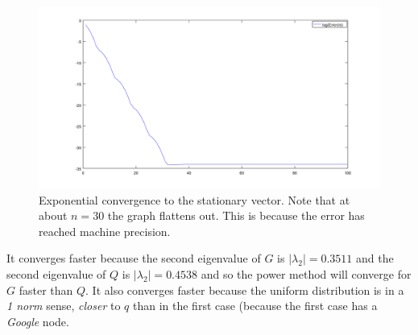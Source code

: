 \documentclass{unswmaths}
\begin{document}
\begin{figure}[h]
    \includegraphics[scale=0.5]{Log_Error_n_2}
    \caption{Exponential convergence to the stationary vector. Note that at about $n = 30 $ the graph flattens out. This is because the error has reached machine precision.}
\end{figure}
It converges faster because the second eigenvalue of $ G $ is $ |\lambda_2| = 0.3511 $ and the second eigenvalue of $ Q $ is $ |\lambda_2|=0.4538 $ and so the power method will converge for $ G $ faster than $ Q $. It also converges faster because the uniform distribution is in a \emph{1 norm} sense, \emph{closer} to $ q $ than in the first case (because the first case has a \emph{Google} node. 
\end{document}
